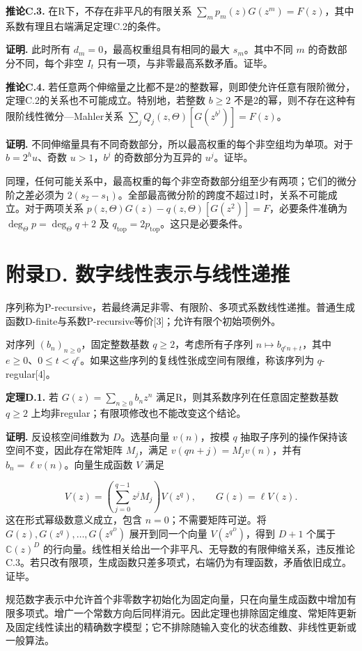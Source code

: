\documentclass[12pt,a4paper]{article}
\begin{document}
\textbf{推论C.3.} 在R下，不存在非平凡的有限关系 $\sum_m p_m(z)G(z^m)=F(z)$，其中系数有理且右端满足定理C.2的条件。

\textbf{证明.} 此时所有 $d_m=0$，最高权重组具有相同的最大 $s_m$。其中不同 $m$ 的奇数部分不同，每个非空 $I_t$ 只有一项，与非零最高系数矛盾。证毕。

\textbf{推论C.4.} 若任意两个伸缩量之比都不是2的整数幂，则即使允许任意有限阶微分，定理C.2的关系也不可能成立。特别地，若整数 $b\ge2$ 不是2的幂，则不存在这种有限阶线性微分—Mahler关系 $\sum_jQ_j(z,\Theta)[G(z^{b^j})]=F(z)$。

\textbf{证明.} 不同伸缩量具有不同奇数部分，所以最高权重的每个非空组均为单项。对于 $b=2^hu$、奇数 $u>1$，$b^j$ 的奇数部分为互异的 $u^j$。证毕。

同理，任何可能关系中，最高权重的每个非空奇数部分组至少有两项；它们的微分阶之差必须为 $2(s_2-s_1)$。全部最高微分阶的跨度不超过1时，关系不可能成立。对于两项关系 $p(z,\Theta)G(z)-q(z,\Theta)[G(z^2)]=F$，必要条件准确为 $\deg_\Theta p=\deg_\Theta q+2$ 及 $q_{\mathrm{top}}=2p_{\mathrm{top}}$。这只是必要条件。

\section*{附录D. 数字线性表示与线性递推}
序列称为P-recursive，若最终满足非零、有限阶、多项式系数线性递推。普通生成函数D-finite与系数P-recursive等价[3]；允许有限个初始项例外。

对序列 $(b_n)_{n\ge0}$，固定整数基数 $q\ge2$，考虑所有子序列 $n\mapsto b_{q^en+t}$，其中 $e\ge0$、$0\le t<q^e$。如果这些序列的复线性张成空间有限维，称该序列为 $q$-regular[4]。

\textbf{定理D.1.} 若 $G(z)=\sum_{n\ge0}b_nz^n$ 满足R，则其系数序列在任意固定整数基数 $q\ge2$ 上均非regular；有限项修改也不能改变这个结论。

\textbf{证明.} 反设核空间维数为 $D$。选基向量 $v(n)$，按模 $q$ 抽取子序列的操作保持该空间不变，因此存在常矩阵 $M_j$，满足 $v(qn+j)=M_jv(n)$，并有 $b_n=\ell v(n)$。向量生成函数 $V$ 满足

\[
V(z)=\left(\sum_{j=0}^{q-1}z^jM_j\right)V(z^q),\qquad G(z)=\ell V(z).
\]
这在形式幂级数意义成立，包含 $n=0$；不需要矩阵可逆。将 $G(z),G(z^q),\ldots,G(z^{q^D})$ 展开到同一个向量 $V(z^{q^D})$，得到 $D+1$ 个属于 $\mathbb C(z)^D$ 的行向量。线性相关给出一个非平凡、无导数的有限伸缩关系，违反推论C.3。若只改有限项，生成函数只差多项式，右端仍为有理函数，矛盾依旧成立。证毕。

规范数字表示中允许首个非零数字初始化为固定向量，只在向量生成函数中增加有限多项式。增广一个常数方向后同样消元。因此定理也排除固定维度、常矩阵更新及固定线性读出的精确数字模型；它不排除随输入变化的状态维数、非线性更新或一般算法。
\end{document}
